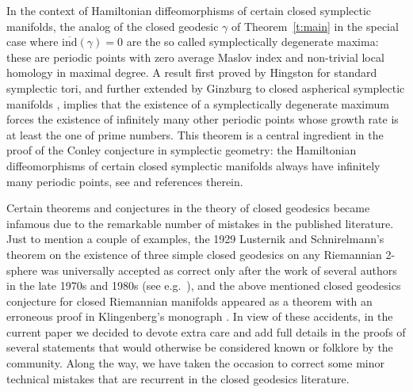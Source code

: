 \documentclass[reqno]{amsart}
\numberwithin{equation}{section}
\theoremstyle{personal}%
\theoremstyle{definition}
\newcommand{\avind}{\overline{\ind}}
\newcommand{\ind}{\mathrm{ind}}
\begin{document}
In the context of Hamiltonian diffeomorphisms of certain closed symplectic manifolds, the analog of the closed geodesic $\gamma$ of Theorem~\ref{t:main} in the special case where $\avind(\gamma)=0$ are the so called symplectically degenerate maxima: these are periodic points with zero average Maslov index and non-trivial local homology in maximal degree. A result first proved by Hingston \cite{Hingston:2009hp} for standard symplectic tori, and further extended by Ginzburg to closed aspherical symplectic manifolds \cite{Ginzburg:2010en}, implies that the existence of a symplectically degenerate maximum forces the existence of infinitely many other periodic points whose growth rate is at least the one of prime numbers. This theorem is a central ingredient in the proof of the Conley conjecture in symplectic geometry: the Hamiltonian diffeomorphisms of certain closed symplectic manifolds always have infinitely many periodic points, see \cite{Hingston:2009hp, Ginzburg:2010en, Hein:2012ml, Ginzburg:2012nx, Ginzburg:2010wh, Mazzucchelli:2013co} and references therein.



Certain theorems and conjectures in the theory of closed geodesics became infamous due to the remarkable number of mistakes in the published literature. Just to mention a couple of examples, the 1929 Lusternik and Schnirelmann's theorem \cite{Lusternik:1934km} on the existence of three simple closed geodesics on any Riemannian 2-sphere was universally accepted as correct only after the work of several authors in the late 1970s and 1980s (see e.g.\ \cite{Ballmann:1978rw, Grayson:1989gd}), and the above mentioned closed geodesics conjecture for closed Riemannian manifolds appeared as a theorem with an erroneous proof in Klingenberg's monograph \cite{Klingenberg:1978so}. In view of these accidents, in the current paper we decided to devote extra care and add full details in the proofs of several statements that would otherwise be considered known or folklore by the community. Along the way, we have taken the occasion to correct some minor technical mistakes that are recurrent in the closed geodesics literature.
\end{document}
